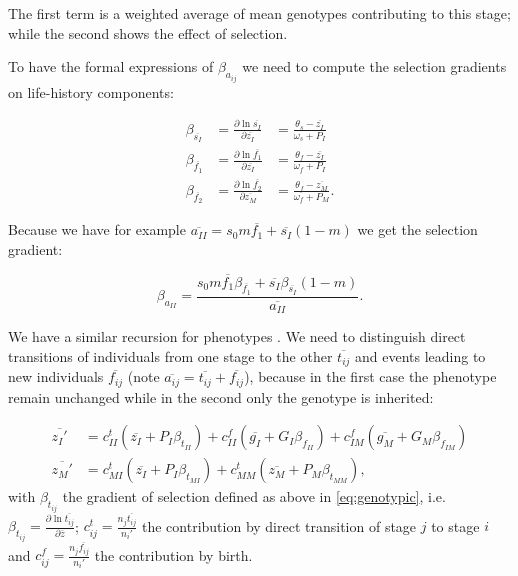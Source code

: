 The first term is a weighted average of mean genotypes contributing to this stage; while the second shows the effect of selection.

To have the formal expressions of $\beta_{a_{ij}}$ we need to compute the selection gradients on life-history components:

\begin{equation}
	\label{eq:selgradlfh}
	\begin{aligned}
	\beta_{\overline{s_I}} &= \frac{\partial \ln \overline{s_I}}{\partial \overline{z_I}} &= \frac{\theta_s - \overline{z_I}}{\omega_s + P_I} \\
	\beta_{\overline{f_1}} &= \frac{\partial \ln \overline{f_1}}{\partial \overline{z_I}} &= \frac{\theta_f - \overline{z_I}}{\omega_f + P_I} \\
	\beta_{\overline{f_2}} &= \frac{\partial \ln \overline{f_2}}{\partial \overline{z_M}} &= \frac{\theta_f - \overline{z_M}}{\omega_f + P_M}.
	\end{aligned}
\end{equation}

Because we have for example $\overline{a_{II}} = s_0 m \overline{f_1} + \overline{s_I} (1-m)$ we get the selection gradient:

\begin{equation}
	\label{eq:selgradaII}
	\beta_{a_{II}} = \frac{s_0 m \overline{f_1} \beta_{\overline{f_1}} + \overline{s_I} \beta_{\overline{s_I}} (1-m)}{\overline{a_{II}}}.
\end{equation}

We have a similar recursion for phenotypes \citep{barfield_evolution_2011}. We need to distinguish direct transitions of individuals from one stage to the other $\overline{t_{ij}}$ and events leading to new individuals $\overline{f_{ij}}$ (note $\overline{a_{ij}} = \overline{t_{ij}} + \overline{f_{ij}}$), because in the first case the phenotype remain unchanged while in the second only the genotype is inherited:

\begin{subequations}
	\begin{align}
	\label{eq:phenotypic}
	\overline{z_I'} &= c_{II}^t (\overline{z_I} + P_I \beta_{t_{II}}) + c_{II}^f (\overline{g_I} + G_I \beta_{f_{II}}) + c_{IM}^f (\overline{g_M} + G_M \beta_{f_{IM}}) \\
	\overline{z_M'} &= c_{MI}^t (\overline{z_I} + P_I \beta_{t_{MI}}) + c_{MM}^t (\overline{z_M} + P_M \beta_{t_{MM}}),
	\end{align}
\end{subequations}
with $\beta_{t_{ij}}$ the gradient of selection defined as above in \autoref{eq:genotypic}, i.e. $\beta_{t_{ij}} = \frac{\partial \ln \overline{t_{ij}}}{\partial \overline{z}}$; $c_{ij}^t = \frac{n_j \overline{t_{ij}}}{n_i'}$ the contribution by direct transition of stage $j$ to stage $i$ and $c_{ij}^f = \frac{n_j \overline{f_{ij}}}{n_i'}$ the contribution by birth.


